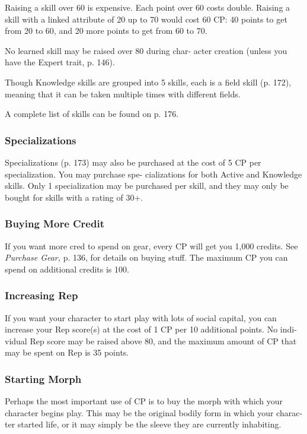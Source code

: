Raising a skill over 60 is expensive. Each point over 
60 costs double. Raising a skill with a linked attribute 
of 20 up to 70 would cost 60 CP: 40 points to get from 
20 to 60, and 20 more points to get from 60 to 70.

No learned skill may be raised over 80 during char-
acter creation (unless you have the Expert trait, p. 146).

Though Knowledge skills are grouped into 5 skills, 
each is a field skill (p. 172), meaning that it can be 
taken multiple times with different fields.

A complete list of skills can be found on p. 176.

\subsubsection{Specializations}

Specializations (p. 173) may also be purchased at the 
cost of 5 CP per specialization. You may purchase spe-
cializations for both Active and Knowledge skills. Only 
1 specialization may be purchased per skill, and they 
may only be bought for skills with a rating of 30+.

\subsubsection{Buying More Credit}

If you want more cred to spend on gear, every CP will 
get you 1,000 credits. See \textit{Purchase Gear,} p. 136, for 
details on buying stuff. The maximum CP you can 
spend on additional credits is 100.

\subsubsection{Increasing Rep}

If you want your character to start play with lots of 
social capital, you can increase your Rep score(s) at 
the cost of 1 CP per 10 additional points. No indi-
vidual Rep score may be raised above 80, and the 
maximum amount of CP that may be spent on Rep 
is 35 points.

\subsubsection{Starting Morph}

Perhaps the most important use of CP is to buy the 
morph with which your character begins play. This 
may be the original bodily form in which your charac-
ter started life, or it may simply be the sleeve they are 
currently inhabiting.

